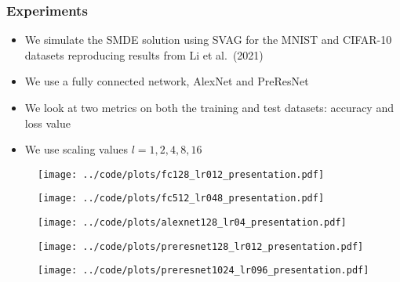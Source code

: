 \documentclass[aspectratio=1610,10pt,ucs]{beamer} %
\begin{document}
\begin{frame}
  \frametitle{Experiments}
  \begin{itemize}
    \item We simulate the SMDE solution using SVAG for the MNIST and CIFAR-10 datasets reproducing results from Li et al.\ (2021)
    \item We use a fully connected network, AlexNet and PreResNet
    \item We look at two metrics on both the training and test datasets: accuracy and loss value
    \item We use scaling values $l=1,2,4,8,16$
  \end{itemize}
\end{frame}
\begin{frame}
  \begin{figure}[htb]
    \centering
    \texttt{[image: ../code/plots/fc128\_lr012\_presentation.pdf]}
  \end{figure}
\end{frame}
\begin{frame}
  \begin{figure}[htb]
    \centering
    \texttt{[image: ../code/plots/fc512\_lr048\_presentation.pdf]}
  \end{figure}
\end{frame}
\begin{frame}
  \begin{figure}[htb]
    \centering
    \texttt{[image: ../code/plots/alexnet128\_lr04\_presentation.pdf]}
  \end{figure}
\end{frame}
\begin{frame}
  \begin{figure}[htb]
    \centering
    \texttt{[image: ../code/plots/preresnet128\_lr012\_presentation.pdf]}
  \end{figure}
\end{frame}
\begin{frame}
  \begin{figure}[htb]
    \centering
    \texttt{[image: ../code/plots/preresnet1024\_lr096\_presentation.pdf]}
  \end{figure}
\end{frame}
\end{document}
